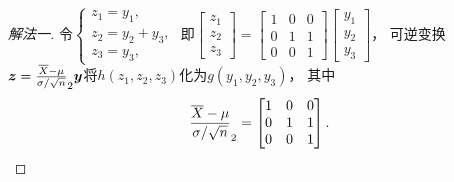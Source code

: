 \begin{example}
\begin{solution}
\begin{proof}[解法一]
令\(\left\{ \begin{array}{l}
	z_1 = y_1, \\
	z_2 = y_2 + y_3, \\
	z_3 = y_3,
\end{array} \right.\)
即\(\begin{bmatrix}
	z_1 \\ z_2 \\ z_3
\end{bmatrix}
= \begin{bmatrix}
	1 & 0 & 0 \\
	0 & 1 & 1 \\
	0 & 0 & 1
\end{bmatrix}
\begin{bmatrix}
	y_1 \\ y_2 \\ y_3
\end{bmatrix}\)，
可逆变换\(\vb{z} = \P_2 \vb{y}\)将\(h(z_1,z_2,z_3)\)化为\(g(y_1,y_2,y_3)\)，
其中\begin{equation*}
	\P_2 = \begin{bmatrix}
		1 & 0 & 0 \\
		0 & 1 & 1 \\
		0 & 0 & 1
	\end{bmatrix}.
\end{equation*}


\end{proof}
\end{solution}
\end{example}
